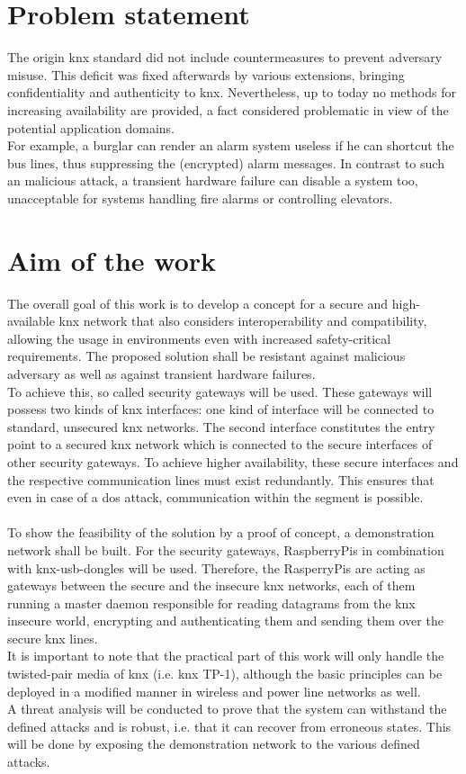 \section{Problem statement}
The origin \gls{knx} standard did not include countermeasures to prevent adversary misuse. This deficit was fixed afterwards by various extensions, bringing confidentiality and
authenticity to \gls{knx}. Nevertheless, up to today no methods for increasing availability are provided, a fact considered problematic in view of the potential application domains.
\\
For example, a burglar can render an alarm system useless if he can shortcut the bus lines, thus suppressing the (encrypted) alarm messages. In contrast to such an malicious attack, a transient
hardware failure can disable a system too, unacceptable for systems handling fire alarms or controlling elevators.

\section{Aim of the work}

The overall goal of this work is to develop a concept for a secure and high-available \gls{knx} network that also considers interoperability and compatibility, 
allowing the usage in environments even with increased safety-critical requirements. The proposed solution shall be resistant against malicious adversary as well as against
transient hardware failures.
\\
To achieve this, so called security gateways will be used. These gateways will possess two kinds of \gls{knx} interfaces: one kind of interface will be
connected to standard, unsecured \gls{knx} networks.
The second interface constitutes the entry point to a secured \gls{knx} network which is connected to the secure interfaces of other
security gateways. To achieve higher availability, these secure interfaces and the respective communication lines must exist redundantly. This ensures that
even in case of a \gls{dos} attack, communication within the segment is possible.
\\
\\
To show the feasibility of the solution by a proof of concept, a demonstration network shall be built.
For the security gateways, RaspberryPis in combination with \gls{knx}-\gls{usb}-dongles will be used. Therefore, the RasperryPis
are acting as gateways between the secure and the insecure \gls{knx} networks, each of them running a master daemon responsible
for reading datagrams from the \gls{knx} insecure world, encrypting and authenticating them and sending them over the secure
\gls{knx} lines.
\\
It is important to note that the practical part of this work will only
handle the twisted-pair media of \gls{knx} (i.e. \gls{knx} \gls{TP}-1), although the basic principles can be deployed in a modified manner in
wireless and power line networks as well.
\\
A threat analysis will be conducted to prove that the system can withstand the defined attacks and is robust,
i.e. that it can recover from erroneous states. This will be done by exposing the demonstration network to the various defined attacks. 

